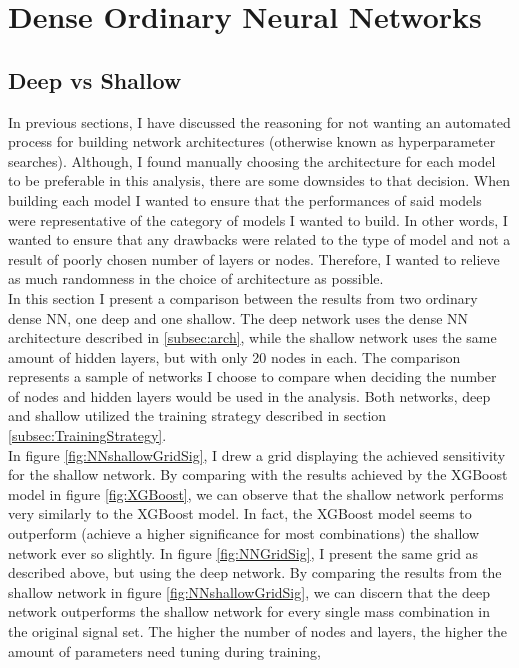 \section{Dense Ordinary Neural Networks}
\subsection{Deep vs Shallow}
In previous sections, I have discussed the reasoning for not wanting an automated process for building network architectures (otherwise known
as hyperparameter searches). Although, I found manually choosing the architecture for each model to be preferable in this analysis, there 
are some downsides to that decision. When building each model I wanted to ensure that the performances of said models were representative of 
the category of models I wanted to build. In other words, I wanted to ensure that any drawbacks were related to the type of model and not 
a result of poorly chosen number of layers or nodes. Therefore, I wanted to relieve as much randomness in the choice of architecture as possible.
\\
In this section I present a comparison between the results from two ordinary dense \ac{NN}, one deep and one shallow. The deep network 
uses the dense \ac{NN} architecture described in \ref{subsec:arch}, while the shallow network uses the same amount of hidden layers,
but with only 20 nodes in each. The comparison represents a sample of networks I choose to compare when deciding the number of nodes and 
hidden layers would be used in the analysis. Both networks, deep and shallow utilized the training strategy described in section 
\ref{subsec:TrainingStrategy}.\\
In figure \ref{fig:NNshallowGridSig}, I drew a grid displaying the achieved sensitivity for the shallow 
network. By comparing with the results achieved by the XGBoost model in figure \ref{fig:XGBoost}, we can observe that the shallow network 
performs very similarly to the XGBoost model. In fact, the XGBoost model seems to outperform (achieve a higher significance for most combinations) 
the shallow network ever so slightly.
In figure \ref{fig:NNGridSig}, I present the same grid as described above, but using the deep network. By comparing the results from the shallow 
network in figure \ref{fig:NNshallowGridSig}, we can discern that the deep network outperforms the shallow network for every single mass 
combination in the original signal set. The higher the number of nodes and layers, the higher the amount of parameters need tuning during training, 
